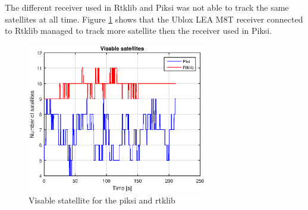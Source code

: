 %
The different receiver used in Rtklib and Piksi was not able to track the same satellites at all time. Figure \ref{figure:NumSatWalk1} shows that the Ublox LEA M8T receiver connected to Rtklib managed to track more satellite then the receiver used in Piksi. 
\begin{figure}[H]
	\centering
		\includegraphics[width=0.7\textwidth]{figs/plots/sv.eps}
		\caption{Visable statellite for the piksi and rtklib}
		\label{figure:NumSatWalk1}
\end{figure}
